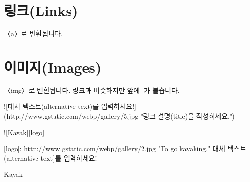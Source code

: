 \documentclass[12pt, a4paper, oneside]{book}
\let\stdsection\section
\renewcommand\section{\newpage\stdsection}
\begin{document}
				\section{링크(Links)}
					
					〈a〉로 변환됩니다.
					
					
%					
%					
					
%					
%					
%					
%					
%					
%					
			
				\section{이미지(Images)}
	
	〈img〉로 변환됩니다.
	링크과 비슷하지만 앞에 !가 붙습니다.
	
	![대체 텍스트(alternative text)를 입력하세요!](http://www.gstatic.com/webp/gallery/5.jpg "링크 설명(title)을 작성하세요.")
	
	![Kayak][logo]
	
	[logo]: http://www.gstatic.com/webp/gallery/2.jpg "To go kayaking."
	대체 텍스트(alternative text)를 입력하세요!
	
	Kayak
			
\end{document}
